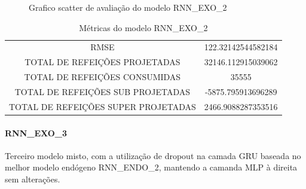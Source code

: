 {\begin{center}
\begin{minipage}[c]{0.45\textwidth}
\begin{figure}[H]
                  \caption{Grafico scatter de avaliação do modelo RNN\_EXO\_2 \label{fig:case1_rnn_exo_2_val_scatter} }
                \end{figure}
                  \end{minipage} \end{center} }
                
                
               
                
                 \begin{table}[!ht]
                \centering
                \caption{Métricas do modelo  RNN\_EXO\_2 }
                 \begin{tabular}{|c|c|}
                 \rowcolor{gray!50}
                 \hline
                \multicolumn{2}{c}{METRICAS DO MODELO RNN\_EXO\_2 :}\\ \hline
                RMSE & 122.32142544582184\\
                TOTAL DE REFEIÇÕES PROJETADAS & 32146.112915039062\\
                TOTAL DE REFEIÇÕES CONSUMIDAS & 35555\\
                TOTAL DE REFEIÇÕES SUB PROJETADAS & -5875.795913696289\\
                TOTAL DE REFEIÇÕES SUPER PROJETADAS & 2466.9088287353516\\
                \hline \end{tabular}
                \end{table}
                
                
              \paragraph{RNN\_EXO\_3}
                Terceiro modelo misto, com a utilização de dropout na camada GRU baseada no melhor modelo endógeno RNN\_ENDO\_2, mantendo a camanda MLP à direita sem alterações.
              
